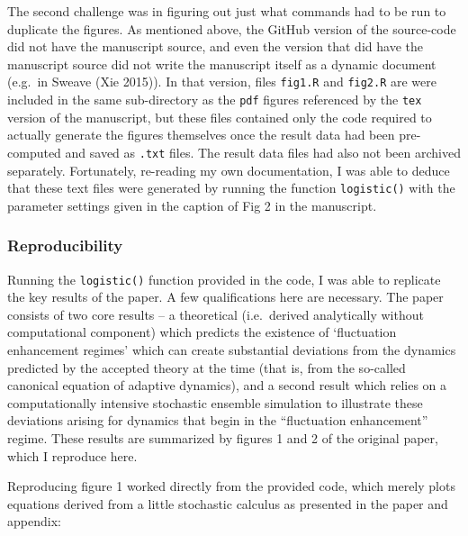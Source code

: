 \documentclass[
]{rescience}
\begin{document}
The second challenge was in figuring out just what commands had to be
run to duplicate the figures. As mentioned above, the GitHub version of
the source-code did not have the manuscript source, and even the version
that did have the manuscript source did not write the manuscript itself
as a dynamic document (e.g.~in Sweave (Xie 2015)). In that version,
files \texttt{fig1.R} and \texttt{fig2.R} are were included in the same
sub-directory as the \texttt{pdf} figures referenced by the \texttt{tex}
version of the manuscript, but these files contained only the code
required to actually generate the figures themselves once the result
data had been pre-computed and saved as \texttt{.txt} files. The result
data files had also not been archived separately. Fortunately,
re-reading my own documentation, I was able to deduce that these text
files were generated by running the function \texttt{logistic()} with
the parameter settings given in the caption of Fig 2 in the manuscript.

\hypertarget{reproducibility}{%
\subsubsection{Reproducibility}\label{reproducibility}}

Running the \texttt{logistic()} function provided in the code, I was
able to replicate the key results of the paper. A few qualifications
here are necessary. The paper consists of two core results -- a
theoretical (i.e.~derived analytically without computational component)
which predicts the existence of `fluctuation enhancement regimes' which
can create substantial deviations from the dynamics predicted by the
accepted theory at the time (that is, from the so-called canonical
equation of adaptive dynamics), and a second result which relies on a
computationally intensive stochastic ensemble simulation to illustrate
these deviations arising for dynamics that begin in the ``fluctuation
enhancement'' regime. These results are summarized by figures 1 and 2 of
the original paper, which I reproduce here.

Reproducing figure 1 worked directly from the provided code, which
merely plots equations derived from a little stochastic calculus as
presented in the paper and appendix:
\end{document}

